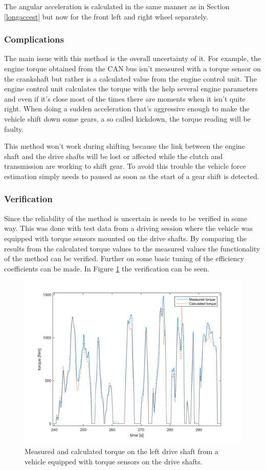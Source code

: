 The angular acceleration is calculated in the same manner as in Section \ref{longaccest} but now for the front left and right wheel separately.


\subsubsection{Complications}
The main issue with this method is the overall uncertainty of it. For example, the engine torque obtained from the CAN bus isn't measured with a torque sensor on the crankshaft but rather is a calculated value from the engine control unit. The engine control unit calculates the torque with the help several engine parameters and even if it's close most of the times there are moments when it isn't quite right. When doing a sudden acceleration that's aggressive enough to make the vehicle shift down some gears, a so called kickdown, the torque reading will be faulty. 

This method won't work during shifting because the link between the engine shaft and the drive shafts will be lost or affected while the clutch and transmission are working to shift gear. To avoid this trouble the vehicle force estimation simply needs to paused as soon as the start of a gear shift is detected.

\subsubsection{Verification}
Since the reliability of the method is uncertain is needs to be verified in some way. This was done with test data from a driving session where the vehicle was equipped with torque sensors mounted on the drive shafts. By comparing the results from the calculated torque values to the measured values the functionality of the method can be verified. Further on some basic tuning of the efficiency coefficients can be made. In Figure \ref{torque_ver} the verification can be seen.

\begin{figure}[h]
	\centering
	\includegraphics[width=1\textwidth]{Pictures/torque_ver}
	\caption{Measured and calculated torque on the left drive shaft from a vehicle equipped with torque sensors on the drive shafts.}
	\label{torque_ver}
\end{figure}

